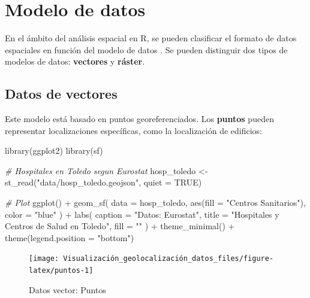 \documentclass[
]{report}
\newenvironment{Shaded}{\begin{snugshade}}{\end{snugshade}}
\newcommand{\AttributeTok}[1]{\textcolor[rgb]{0.77,0.63,0.00}{#1}}
\newcommand{\CommentTok}[1]{\textcolor[rgb]{0.56,0.35,0.01}{\textit{#1}}}
\newcommand{\ConstantTok}[1]{\textcolor[rgb]{0.00,0.00,0.00}{#1}}
\newcommand{\FunctionTok}[1]{\textcolor[rgb]{0.00,0.00,0.00}{#1}}
\newcommand{\NormalTok}[1]{#1}
\newcommand{\OtherTok}[1]{\textcolor[rgb]{0.56,0.35,0.01}{#1}}
\newcommand{\SpecialCharTok}[1]{\textcolor[rgb]{0.00,0.00,0.00}{#1}}
\newcommand{\StringTok}[1]{\textcolor[rgb]{0.31,0.60,0.02}{#1}}
\theoremstyle{definition}
\theoremstyle{definition}
\theoremstyle{definition}
\theoremstyle{definition}
\theoremstyle{remark}
\begin{document}
\hypertarget{modelo-de-datos}{%
\section{Modelo de datos}\label{modelo-de-datos}}

En el ámbito del análisis espacial en R, se pueden clasificar el formato de
datos espaciales en función del modelo de datos \citep{Lovelance_et_al_2019}. Se
pueden distinguir dos tipos de modelos de datos: \textbf{vectores} y \textbf{ráster}.

\hypertarget{vec}{%
\subsection{Datos de vectores}\label{vec}}

Este modelo está basado en puntos georeferenciados. Los \textbf{puntos} pueden
representar localizaciones específicas, como la localización de edificios:

\begin{Shaded}
\begin{Highlighting}[]

\FunctionTok{library}\NormalTok{(ggplot2)}
\FunctionTok{library}\NormalTok{(sf)}


\CommentTok{\# Hospitales en Toledo segun Eurostat}
\NormalTok{hosp\_toledo }\OtherTok{\textless{}{-}} \FunctionTok{st\_read}\NormalTok{(}\StringTok{"data/hosp\_toledo.geojson"}\NormalTok{, }\AttributeTok{quiet =} \ConstantTok{TRUE}\NormalTok{)}

\CommentTok{\# Plot}
\FunctionTok{ggplot}\NormalTok{() }\SpecialCharTok{+}
  \FunctionTok{geom\_sf}\NormalTok{(}
    \AttributeTok{data =}\NormalTok{ hosp\_toledo, }\FunctionTok{aes}\NormalTok{(}\AttributeTok{fill =} \StringTok{"Centros Sanitarios"}\NormalTok{),}
    \AttributeTok{color =} \StringTok{"blue"}
\NormalTok{  ) }\SpecialCharTok{+}
  \FunctionTok{labs}\NormalTok{(}
    \AttributeTok{caption =} \StringTok{"Datos: Eurostat"}\NormalTok{,}
    \AttributeTok{title =} \StringTok{"Hospitales y Centros de Salud en Toledo"}\NormalTok{,}
    \AttributeTok{fill =} \StringTok{""}
\NormalTok{  ) }\SpecialCharTok{+}
  \FunctionTok{theme\_minimal}\NormalTok{() }\SpecialCharTok{+}
  \FunctionTok{theme}\NormalTok{(}\AttributeTok{legend.position =} \StringTok{"bottom"}\NormalTok{)}
\end{Highlighting}
\end{Shaded}

\begin{figure}

{\centering \texttt{[image: Visualización\_geolocalización\_datos\_files/figure-latex/puntos-1]} 

}

\caption{Datos vector: Puntos}\label{fig:puntos}
\end{figure}
\end{document}
